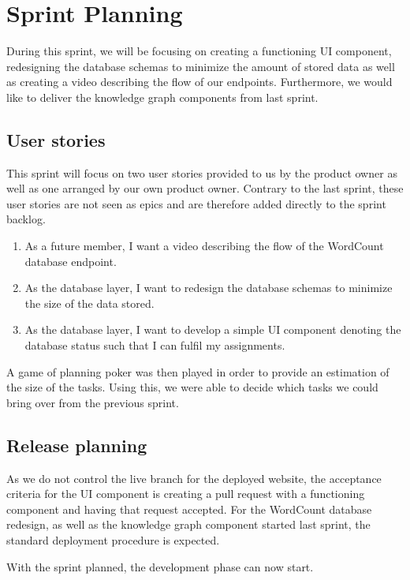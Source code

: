\section{Sprint Planning}
During this sprint, we will be focusing on creating a functioning UI component, redesigning the database schemas to minimize the amount of stored data as well as creating a video describing the flow of our endpoints. Furthermore, we would like to deliver the knowledge graph components from last sprint. 

\subsection*{User stories}
This sprint will focus on two user stories provided to us by the \knox{} product owner as well as one arranged by our own product owner. 
Contrary to the last sprint, these user stories are not seen as epics and are therefore added directly to the sprint backlog. 

\begin{enumerate}
    \item As a future \knox{} member, I want a video describing the flow of the WordCount database endpoint. 
    \item As the database layer, I want to redesign the database schemas to minimize the size of the data stored. 
    \item As the database layer, I want to develop a simple UI component denoting the database status such that I can fulfil my \knox{} assignments. 
\end{enumerate}

A game of planning poker was then played in order to provide an estimation of the size of the tasks. 
Using this, we were able to decide which tasks we could bring over from the previous sprint.

\subsection*{Release planning}
As we do not control the live branch for the deployed \knox{} website, the acceptance criteria for the UI component is creating a pull request with a functioning component and having that request accepted.
For the WordCount database redesign, as well as the knowledge graph component started last sprint, the standard deployment procedure is expected. 

With the sprint planned, the development phase can now start.
